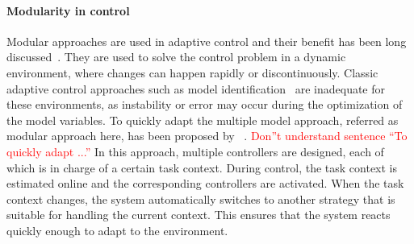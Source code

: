 \paragraph{Modularity in control}
Modular approaches are used in adaptive control and their benefit has been long discussed~\citep{jacobs1991adaptive,narendra1997adaptive}. They are used to solve the control problem in a dynamic environment, where changes can happen rapidly or discontinuously.
Classic adaptive control approaches such as model identification~\citep{khalil2004modeling} are inadequate for these environments, as instability or error may occur during the optimization of the model variables. To quickly adapt the multiple model approach, referred as modular approach here, has been proposed by ~\citet{narendra1995adaptation}. 
\textcolor{red}{Don''t understand sentence ``To quickly adapt ...''}
In this approach, multiple controllers are designed, each of which is in charge of a certain task context. During control, the task context is estimated online and the corresponding controllers are activated. When the task context changes, the system automatically switches to another strategy that is suitable for handling the current context. This ensures that the system reacts quickly enough to adapt to the environment.

